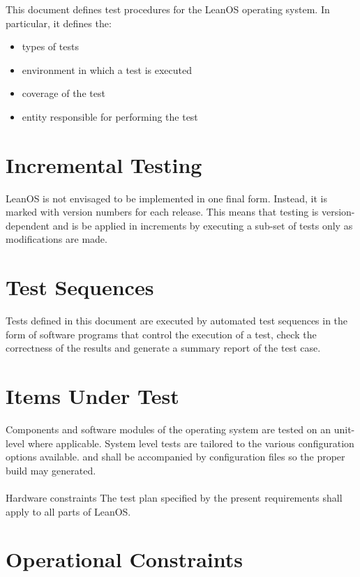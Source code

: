 This document defines test procedures for the LeanOS operating system.
In particular, it defines the:
\begin{itemize}
	\item types of tests
	\item environment in which a test is executed
	\item coverage of the test
	\item entity responsible for performing the test
\end{itemize}


\section{Incremental Testing}

LeanOS is not envisaged to be implemented in one final form. Instead, it is
marked with version numbers for each release. This means that testing is
version-dependent and is be applied in increments by executing a sub-set of
tests only as modifications are made.


\section{Test Sequences}

Tests defined in this document are executed by automated test sequences in the
form of software programs that control the execution of a test, check the
correctness of the results and generate a summary report of the test case.



\section{Items Under Test}

Components and software modules of the operating system are tested on an
unit-level where applicable. System level tests are tailored to the
various configuration options available. and shall be accompanied by
configuration files so the proper build may generated.\\
\\

 {Hardware constraints}{%
The test plan specified by the present requirements shall apply to all parts %
of LeanOS.
}{}



\section{Operational Constraints}

